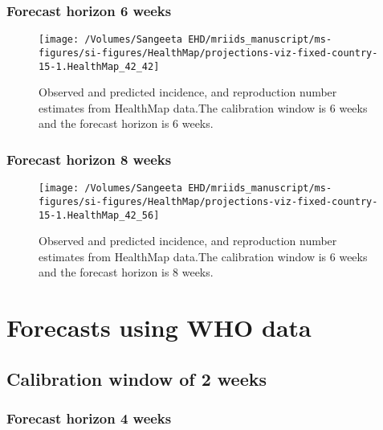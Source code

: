 \documentclass[11pt,]{article}
\begin{document}
\hypertarget{forecast-horizon-6-weeks-5}{%
  \subsubsection{Forecast horizon 6 weeks}\label{forecast-horizon-6-weeks-5}}

\begin{figure}

  {\centering \texttt{[image: /Volumes/Sangeeta EHD/mriids\_manuscript/ms-figures/si-figures/HealthMap/projections-viz-fixed-country-15-1.HealthMap\_42\_42]} 

  }

  \caption{Observed and predicted incidence, and
    reproduction number estimates from HealthMap data.The calibration
    window is 6 weeks and the forecast horizon is 6 weeks.}
  \label{fig:hm66}
\end{figure}

\hypertarget{forecast-horizon-8-weeks-5}{%
  \subsubsection{Forecast horizon 8 weeks}\label{forecast-horizon-8-weeks-5}}

\begin{figure}

  {\centering \texttt{[image: /Volumes/Sangeeta EHD/mriids\_manuscript/ms-figures/si-figures/HealthMap/projections-viz-fixed-country-15-1.HealthMap\_42\_56]} 

  }

  \caption{Observed and predicted incidence, and reproduction number
    estimates from HealthMap data.The calibration window is 6 weeks
    and the forecast horizon is 8 weeks.}
  \label{fig:hm68}
\end{figure}

\hypertarget{forecasts-using-who-data}{%
  \section{Forecasts using WHO data}\label{forecasts-using-who-data}}

\hypertarget{calibration-window-of-2-weeks-2}{%
  \subsection{Calibration window of 2 weeks}\label{calibration-window-of-2-weeks-2}}

\hypertarget{forecast-horizon-4-weeks-5}{%
  \subsubsection{Forecast horizon 4 weeks}\label{forecast-horizon-4-weeks-5}}
\end{document}
